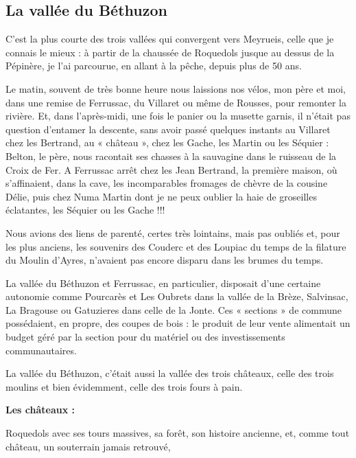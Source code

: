 
\subsection{La vallée du Béthuzon}

C’est la plus courte des trois vallées qui convergent vers Meyrueis, celle que je connais le mieux : à
partir de la chaussée de Roquedols jusque au dessus de la Pépinère, je l’ai parcourue, en allant à la
pêche, depuis plus de 50 ans.

Le matin, souvent de très bonne heure nous laissions nos vélos, mon père et moi, dans une remise de
Ferrussac, du Villaret ou même de Rousses, pour remonter la rivière. Et, dans l’après-midi, une fois le
panier ou la musette garnis, il n’était pas question d’entamer la descente, sans avoir passé quelques
instants au Villaret chez les Bertrand, au « château », chez les Gache, les Martin ou les Séquier :
Belton, le père, nous racontait ses chasses à la sauvagine dans le ruisseau de la Croix de Fer. A
Ferrussac arrêt chez les Jean Bertrand, la première maison, où s’affinaient, dans la cave, les
incomparables fromages de chèvre de la cousine Délie, puis chez Numa Martin dont je ne peux
oublier la haie de groseilles éclatantes, les Séquier ou les Gache !!!

Nous avions des liens de parenté, certes très lointains, mais pas oubliés et, pour les plus anciens, les
souvenirs des Couderc et des Loupiac du temps de la filature du Moulin d’Ayres, n’avaient pas encore
disparu dans les brumes du temps.

La vallée du Béthuzon et Ferrussac, en particulier, disposait d’une certaine autonomie comme
Pourcarès et Les Oubrets dans la vallée de la Brèze, Salvinsac, La Bragouse ou Gatuzieres dans celle
de la Jonte. Ces « sections » de commune possédaient, en propre, des coupes de bois : le produit de
leur vente alimentait un budget géré par la section pour du matériel ou des investissements
communautaires.

La vallée du Béthuzon, c’était aussi la vallée des trois châteaux, celle des trois moulins et bien
évidemment, celle des trois fours à pain.

\textbf{Les châteaux :}

Roquedols avec ses tours massives, sa forêt, son histoire ancienne, et, comme tout château, un
souterrain jamais retrouvé,

